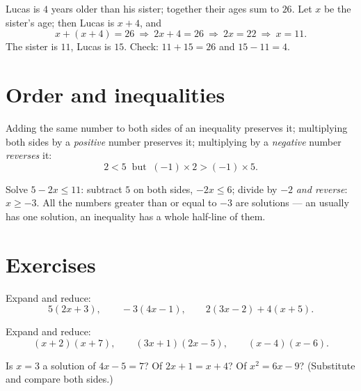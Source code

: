 \begin{example}\label{ex:g8:equations:problem}
Lucas is $4$ years older than his sister; together their ages sum to
$26$. Let $x$ be the sister's age; then Lucas is $x + 4$, and
\[
x + (x + 4) = 26
\ \Longrightarrow\
2x + 4 = 26
\ \Longrightarrow\
2x = 22
\ \Longrightarrow\
x = 11 .
\]
The sister is $11$, Lucas is $15$. Check: $11 + 15 = 26$ and
$15 - 11 = 4$.
\end{example}

\section{Order and inequalities}

\begin{proposition}\label{prop:g8:equations:order}
Adding the same number to both sides of an inequality preserves it;
multiplying both sides by a \emph{positive} number preserves it;
multiplying by a \emph{negative} number \emph{reverses} it:
\[
2 < 5 \ \text{ but }\ (-1) \times 2 > (-1) \times 5 .
\]
\end{proposition}
\admitted

\begin{example}\label{ex:g8:equations:inequality}
Solve $5 - 2x \leq 11$: subtract $5$ on both sides, $-2x \leq 6$;
divide by $-2$ \emph{and reverse}: $x \geq -3$. All the numbers
greater than or equal to $-3$ are solutions --- an  usually
has one solution, an inequality has a whole half-line of them.
\end{example}

\section{Exercises}

\begin{exercise}[$\star$]\label{exo:g8:equations:1}
Expand and reduce:
\[
5(2x + 3), \qquad
-3(4x - 1), \qquad
2(3x - 2) + 4(x + 5).
\]
\end{exercise}

\begin{exercise}[$\star$]\label{exo:g8:equations:2}
Expand and reduce:
\[
(x + 2)(x + 7), \qquad
(3x + 1)(2x - 5), \qquad
(x - 4)(x - 6).
\]
\end{exercise}

\begin{exercise}[$\star$]\label{exo:g8:equations:3}
Is $x = 3$ a solution of $4x - 5 = 7$? Of $2x + 1 = x + 4$? Of
$x^2 = 6x - 9$? (Substitute and compare both sides.)
\end{exercise}

